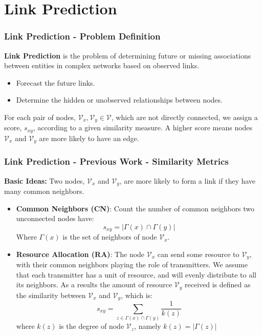 \documentclass[9pt]{beamer}
\begin{document}
\section{Link Prediction}

\begin{frame}
\frametitle{Link Prediction - Problem Definition}

\textbf{Link Prediction} is the problem of determining future or missing associations between entities in complex networks based on observed links.
\begin{itemize}
\item Forecast the future links.
\item Determine the hidden or unobserved relationships between nodes.
\end{itemize}

For each pair of nodes, $\mathcal{V}_x,\mathcal{V}_y\in \mathcal{V}$, which are not directly connected, we assign a score, $s_{xy}$, according to a given similarity measure. A higher score means nodes $\mathcal{V}_x$ and $\mathcal{V}_y$ are more likely to have an edge. 
\end{frame}


\begin{frame}
\frametitle{Link Prediction - Previous Work - Similarity Metrics}
\textbf{Basic Ideas:} Two nodes, $\mathcal{V}_x$ and $\mathcal{V}_y$, are more likely to form a link if they have many common neighbors. 
\begin{itemize}
\item \textbf{Common Neighbors (CN)}: Count the number of common neighbors two unconnected nodes have:
\begin{equation}
s_{xy}=|\Gamma(x)\cap\Gamma(y)|
\end{equation}
Where $\Gamma(x)$ is the set of neighbors of node $\mathcal{V}_x$. 
\item \textbf{Resource Allocation (RA)}: The node $\mathcal{V}_x$ can send some resource to $\mathcal{V}_y$, with their common neighbors playing the role of transmitters. We assume that each transmitter has a unit of resource, and will evenly distribute to all its neighbors. As a results the amount of resource $\mathcal{V}_y$ received is defined as the similarity
between $\mathcal{V}_x$ and $\mathcal{V}_y$, which is:
\begin{equation}
s_{xy}=\sum_{z\in \Gamma(x)\cap\Gamma(y)}\frac{1}{k(z)}
\end{equation}
where $k(z)$ is the degree of node $\mathcal{V}_z$, namely $k(z) = |\Gamma(z)|$
\end{itemize}
\end{frame}
\end{document}
